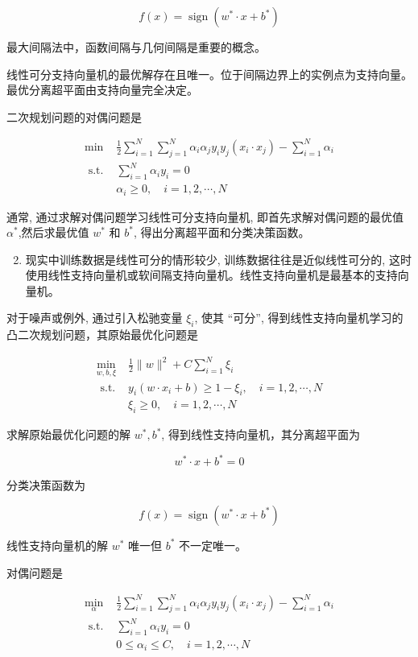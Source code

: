 \documentclass[10pt]{article}
\begin{document}
$$
f(x)=\operatorname{sign}\left(w^{*} \cdot x+b^{*}\right)
$$

最大间隔法中，函数间隔与几何间隔是重要的概念。

线性可分支持向量机的最优解存在且唯一。位于间隔边界上的实例点为支持向量。最优分离超平面由支持向量完全决定。

二次规划问题的对偶问题是

$$
\begin{array}{ll}
\min & \frac{1}{2} \sum_{i=1}^{N} \sum_{j=1}^{N} \alpha_{i} \alpha_{j} y_{i} y_{j}\left(x_{i} \cdot x_{j}\right)-\sum_{i=1}^{N} \alpha_{i} \\
\text { s.t. } & \sum_{i=1}^{N} \alpha_{i} y_{i}=0 \\
& \alpha_{i} \geqslant 0, \quad i=1,2, \cdots, N
\end{array}
$$

通常, 通过求解对偶问题学习线性可分支持向量机, 即首先求解对偶问题的最优值 $\alpha^{*}$,然后求最优值 $w^{*}$ 和 $b^{*}$, 得出分离超平面和分类决策函数。

\begin{enumerate}
  \setcounter{enumi}{1}
  \item 现实中训练数据是线性可分的情形较少, 训练数据往往是近似线性可分的, 这时使用线性支持向量机或软间隔支持向量机。线性支持向量机是最基本的支持向量机。
\end{enumerate}

对于噪声或例外, 通过引入松驰变量 $\xi_{i}$, 使其 “可分”, 得到线性支持向量机学习的凸二次规划问题，其原始最优化问题是

$$
\begin{array}{ll}
\min _{w, b, \xi} & \frac{1}{2}\|w\|^{2}+C \sum_{i=1}^{N} \xi_{i} \\
\text { s.t. } & y_{i}\left(w \cdot x_{i}+b\right) \geqslant 1-\xi_{i}, \quad i=1,2, \cdots, N \\
& \xi_{i} \geqslant 0, \quad i=1,2, \cdots, N
\end{array}
$$

求解原始最优化问题的解 $w^{*}, b^{*}$, 得到线性支持向量机，其分离超平面为

$$
w^{*} \cdot x+b^{*}=0
$$

分类决策函数为

$$
f(x)=\operatorname{sign}\left(w^{*} \cdot x+b^{*}\right)
$$

线性支持向量机的解 $w^{*}$ 唯一但 $b^{*}$ 不一定唯一。

对偶问题是

$$
\begin{array}{ll}
\min _{\alpha} & \frac{1}{2} \sum_{i=1}^{N} \sum_{j=1}^{N} \alpha_{i} \alpha_{j} y_{i} y_{j}\left(x_{i} \cdot x_{j}\right)-\sum_{i=1}^{N} \alpha_{i} \\
\text { s.t. } & \sum_{i=1}^{N} \alpha_{i} y_{i}=0 \\
& 0 \leqslant \alpha_{i} \leqslant C, \quad i=1,2, \cdots, N
\end{array}
$$
\end{document}
